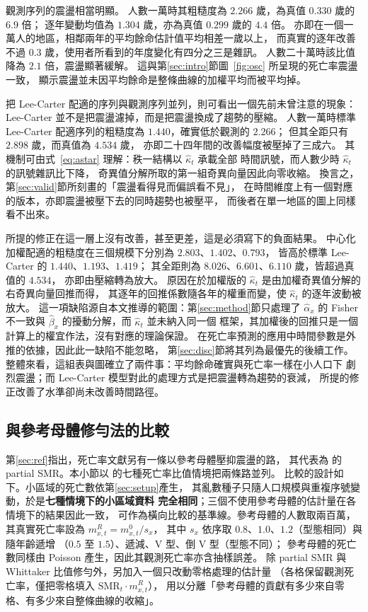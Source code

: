 \documentclass[UTF8, fontset=macnew, a4paper, 12pt]{ctexart}
\begin{document}
觀測序列的震盪相當明顯。
人數一萬時其粗糙度為 $2.266$ 歲，為真值 $0.330$ 歲的 $6.9$ 倍；
逐年變動均值為 $1.304$ 歲，亦為真值 $0.299$ 歲的 $4.4$ 倍。
亦即在一個一萬人的地區，相鄰兩年的平均餘命估計值平均相差一歲以上，
而真實的逐年改善不過 $0.3$ 歲，使用者所看到的年度變化有四分之三是雜訊。
人數二十萬時該比值降為 $2.1$ 倍，震盪顯著緩解。
這與第\ref{sec:intro}節圖~\ref{fig:osc} 所呈現的死亡率震盪一致，
顯示震盪並未因平均餘命是整條曲線的加權平均而被平均掉。

把 Lee-Carter 配適的序列與觀測序列並列，則可看出一個先前未曾注意的現象：
Lee-Carter 並不是把震盪濾掉，而是把震盪換成了趨勢的壓縮。
人數一萬時標準 Lee-Carter 配適序列的粗糙度為 $1.440$，確實低於觀測的 $2.266$；
但其全距只有 $2.898$ 歲，而真值為 $4.534$ 歲，
亦即二十四年間的改善幅度被壓掉了三成六。
其機制可由式~\eqref{eq:astar} 理解：秩一結構以 $\hat\kappa_t$ 承載全部
時間訊號，而人數少時 $\hat\kappa_t$ 的訊號雜訊比下降，
奇異值分解所取的第一組奇異向量因此向零收縮。
換言之，第\ref{sec:valid}節所刻畫的「震盪看得見而偏誤看不見」，
在時間維度上有一個對應的版本，亦即震盪被壓下去的同時趨勢也被壓平，
而後者在單一地區的圖上同樣看不出來。

所提的修正在這一層上沒有改善，甚至更差，這是必須寫下的負面結果。
中心化加權配適的粗糙度在三個規模下分別為 $2.803$、$1.402$、$0.793$，
皆高於標準 Lee-Carter 的 $1.440$、$1.193$、$1.419$；
其全距則為 $8.026$、$6.601$、$6.110$ 歲，皆超過真值的 $4.534$，
亦即由壓縮轉為放大。
原因在於加權版的 $\hat\kappa_t$ 是由加權奇異值分解的右奇異向量回推而得，
其逐年的回推係數隨各年的權重而變，使 $\hat\kappa_t$ 的逐年波動被放大。
這一項缺陷源自本文推導的範圍：第\ref{sec:method}節只處理了 $\hat\alpha_x$ 的
Fisher 不一致與 $\hat\beta_x$ 的擾動分解，而 $\hat\kappa_t$ 並未納入同一個
框架，其加權後的回推只是一個計算上的權宜作法，沒有對應的理論保證。
在死亡率預測的應用中時間參數是外推的依據，因此此一缺陷不能忽略，
第\ref{sec:disc}節將其列為最優先的後續工作。
整體來看，這組表與圖確立了兩件事：平均餘命確實與死亡率一樣在小人口下
劇烈震盪；而 Lee-Carter 模型對此的處理方式是把震盪轉為趨勢的衰減，
所提的修正改善了水準卻尚未改善時間路徑。

\subsection{與參考母體修勻法的比較}\label{sec:smr}

第\ref{sec:ref}指出，死亡率文獻另有一條以參考母體壓抑震盪的路，
其代表為 \citet{lee2003}的 partial SMR。本小節以 \citet[Figure 2]{yue2019}
的七種死亡率比值情境把兩條路並列。
比較的設計如下。小區域的死亡數依第\ref{sec:setup}產生，
其亂數種子只隨人口規模與重複序號變動，於是\textbf{七種情境下的小區域資料
完全相同}；三個不使用參考母體的估計量在各情境下的結果因此一致，
可作為橫向比較的基準線。參考母體的人數取兩百萬，
其真實死亡率設為 $m^{R}_{x,t}=m^{0}_{x,t}/s_x$，
其中 $s_x$ 依序取 $0.8$、$1.0$、$1.2$（型態相同）與隨年齡遞增
（$0.5$ 至 $1.5$）、遞減、V 型、倒 V 型（型態不同）；
參考母體的死亡數同樣由 Poisson 產生，因此其觀測死亡率亦含抽樣誤差。
除 partial SMR 與 Whittaker 比值修勻外，另加入一個只改動零格處理的估計量
（各格保留觀測死亡率，僅把零格填入 $\mathrm{SMR}_t\cdot m^{R}_{x,t}$），
用以分離「參考母體的貢獻有多少來自零格、有多少來自整條曲線的收縮」。
\end{document}
